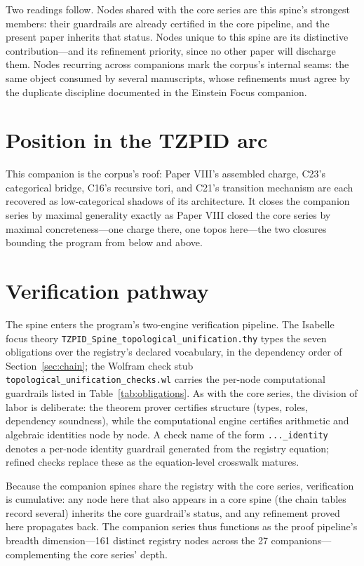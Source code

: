 \documentclass[11pt]{article}
\theoremstyle{remark}
\begin{document}
Two readings follow. Nodes shared with the core series are this spine's strongest members: their guardrails are already certified in the core pipeline, and the present paper inherits that status. Nodes unique to this spine are its distinctive contribution---and its refinement priority, since no other paper will discharge them. Nodes recurring across companions mark the corpus's internal seams: the same object consumed by several manuscripts, whose refinements must agree by the duplicate discipline documented in the Einstein Focus companion.

\section{Position in the TZPID arc}
\label{sec:arc}

This companion is the corpus's roof: Paper VIII's assembled charge, C23's categorical bridge, C16's recursive tori, and C21's transition mechanism are each recovered as low-categorical shadows of its architecture. It closes the companion series by maximal generality exactly as Paper VIII closed the core series by maximal concreteness---one charge there, one topos here---the two closures bounding the program from below and above.

\section{Verification pathway}
\label{sec:verify}

The spine enters the program's two-engine verification pipeline. The Isabelle focus theory \texttt{TZPID\_Spine\_topological\_unification.thy} types the seven obligations over the registry's declared vocabulary, in the dependency order of Section~\ref{sec:chain}; the Wolfram check stub \texttt{topological\_unification\_checks.wl} carries the per-node computational guardrails listed in Table~\ref{tab:obligations}. As with the core series, the division of labor is deliberate: the theorem prover certifies structure (types, roles, dependency soundness), while the computational engine certifies arithmetic and algebraic identities node by node. A check name of the form \texttt{...\_identity} denotes a per-node identity guardrail generated from the registry equation; refined checks replace these as the equation-level crosswalk matures.

Because the companion spines share the registry with the core series, verification is cumulative: any node here that also appears in a core spine (the chain tables record several) inherits the core guardrail's status, and any refinement proved here propagates back. The companion series thus functions as the proof pipeline's breadth dimension---161 distinct registry nodes across the 27 companions---complementing the core series' depth.
\end{document}
